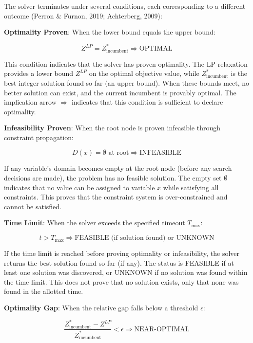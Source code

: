 \documentclass[12pt,a4paper]{article}
\begin{document}
The solver terminates under several conditions, each corresponding to a different outcome (Perron \& Furnon, 2019; Achterberg, 2009):

\textbf{Optimality Proven}: When the lower bound equals the upper bound:

\begin{equation}
Z^{LP} = Z^*_{\text{incumbent}} \Rightarrow \text{OPTIMAL}
\end{equation}

This condition indicates that the solver has proven optimality. The LP relaxation provides a lower bound $Z^{LP}$ on the optimal objective value, while $Z^*_{\text{incumbent}}$ is the best integer solution found so far (an upper bound). When these bounds meet, no better solution can exist, and the current incumbent is provably optimal. The implication arrow $\Rightarrow$ indicates that this condition is sufficient to declare optimality.

\textbf{Infeasibility Proven}: When the root node is proven infeasible through constraint propagation:

\begin{equation}
D(x) = \emptyset \text{ at root} \Rightarrow \text{INFEASIBLE}
\end{equation}

If any variable's domain becomes empty at the root node (before any search decisions are made), the problem has no feasible solution. The empty set $\emptyset$ indicates that no value can be assigned to variable $x$ while satisfying all constraints. This proves that the constraint system is over-constrained and cannot be satisfied.

\textbf{Time Limit}: When the solver exceeds the specified timeout $T_{\max}$:

\begin{equation}
t > T_{\max} \Rightarrow \text{FEASIBLE (if solution found) or UNKNOWN}
\end{equation}

If the time limit is reached before proving optimality or infeasibility, the solver returns the best solution found so far (if any). The status is FEASIBLE if at least one solution was discovered, or UNKNOWN if no solution was found within the time limit. This does not prove that no solution exists, only that none was found in the allotted time.

\textbf{Optimality Gap}: When the relative gap falls below a threshold $\epsilon$:

\begin{equation}
\frac{Z^*_{\text{incumbent}} - Z^{LP}}{Z^*_{\text{incumbent}}} < \epsilon \Rightarrow \text{NEAR-OPTIMAL}
\end{equation}
\end{document}
